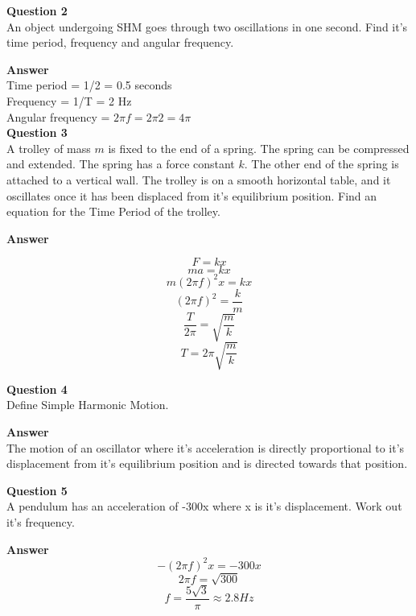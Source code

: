 \documentclass{article}
\begin{document}
\textbf{Question 2}\\
An object undergoing SHM goes through two oscillations in one second. Find it's
time period, frequency and angular frequency.

\textbf{Answer}\\
Time period = 1/2 = 0.5 seconds\\
Frequency = 1/T = 2 Hz\\
Angular frequency = $2 \pi f = 2 \pi 2 = 4 \pi$\\

\textbf{Question 3}\\
A trolley of mass $m$ is fixed to the end of a spring. The spring can be
compressed and extended. The spring has a force constant $k$. The other end of
the spring is attached to a vertical wall. The trolley is on a smooth horizontal
table, and it oscillates once it has been displaced from it's equilibrium
position. Find an equation for the Time Period of the trolley.

\textbf{Answer}\\
\begin{multicols}{2}
\[
	F = kx
\]
\[
	ma = kx
\]
\[
	m(2 \pi f)^2x = kx
\]
\[
	(2 \pi f)^2 = \frac{k}{m}
\]
\[
	\frac{T}{2 \pi} = \sqrt{\frac{m}{k}}
\]
\[
	T = 2 \pi \sqrt{\frac{m}{k}}
\]
\end{multicols}

\textbf{Question 4}\\
Define Simple Harmonic Motion.

\textbf{Answer}\\
The motion of an oscillator where it's acceleration is directly proportional to
it's displacement from it's equilibrium position and is directed towards that
position.

\textbf{Question 5}\\
A pendulum has an acceleration of -300x where x is it's displacement. Work out
it's frequency.

\textbf{Answer}\\
\[
	-(2 \pi f)^2x = -300x
\]
\[
	2 \pi f = \sqrt{300}
\]
\[
	f = \frac{5\sqrt{3}}{\pi} \approx 2.8Hz
\]
\end{document}
